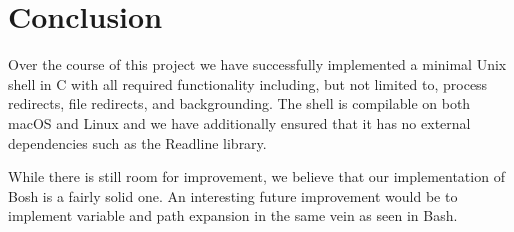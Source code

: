 \section{Conclusion}
\label{sec:conclusion}

Over the course of this project we have successfully implemented a minimal Unix shell in C with all required functionality including, but not limited to, process redirects, file redirects, and backgrounding. The shell is compilable on both macOS and Linux and we have additionally ensured that it has no external dependencies such as the Readline library.

While there is still room for improvement, we believe that our implementation of Bosh is a fairly solid one. An interesting future improvement would be to implement variable and path expansion in the same vein as seen in Bash.
